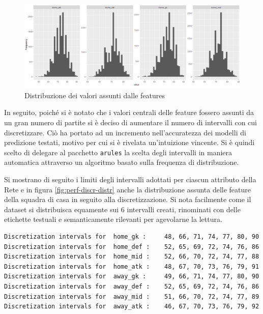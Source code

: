 \documentclass[hidelinks, 12pt]{article}
\begin{document}
\begin{figure}[H]
	\centering
	\includegraphics[scale=0.47]{images/06_03_score_distr.png}
	\caption[Distribuzione dei valori assunti dalle features]{Distribuzione dei valori assunti dalle features}
	\label{fig:perf-scores-distr}
\end{figure}

In seguito, poiché si è notato che i valori centrali delle feature fossero assunti da un gran numero di partite si è deciso di aumentare il numero di intervalli con cui discretizzare. Ciò ha portato ad un incremento nell'accuratezza dei modelli di predizione testati, motivo per cui si è rivelata un'intuizione vincente. Si è quindi scelto di delegare al pacchetto \texttt{arules} la scelta degli intervalli in maniera automatica attraverso un algoritmo basato sulla frequenza di distribuzione.

Si mostrano di seguito i limiti degli intervalli adottati per ciascun attributo della Rete e in figura \ref{fig:perf-discr-distr} anche la distribuzione assunta delle feature della squadra di casa in seguito alla discretizzazione. Si nota facilmente come il dataset si distribuisca equamente sui 6 intervalli creati, rinominati con delle etichette testuali e semanticamente rilevanti per agevolarne la lettura.

\begin{verbatim}
Discretization intervals for  home_gk :     48, 66, 71, 74, 77, 80, 90
Discretization intervals for  home_def :    52, 65, 69, 72, 74, 76, 86
Discretization intervals for  home_mid :    52, 66, 70, 72, 74, 77, 88
Discretization intervals for  home_atk :    48, 67, 70, 73, 76, 79, 91
Discretization intervals for  away_gk :     49, 66, 71, 74, 77, 80, 90
Discretization intervals for  away_def :    52, 65, 69, 72, 74, 76, 86
Discretization intervals for  away_mid :    51, 66, 70, 72, 74, 77, 89
Discretization intervals for  away_atk :    46, 67, 70, 73, 76, 79, 92
\end{verbatim}
\end{document}
